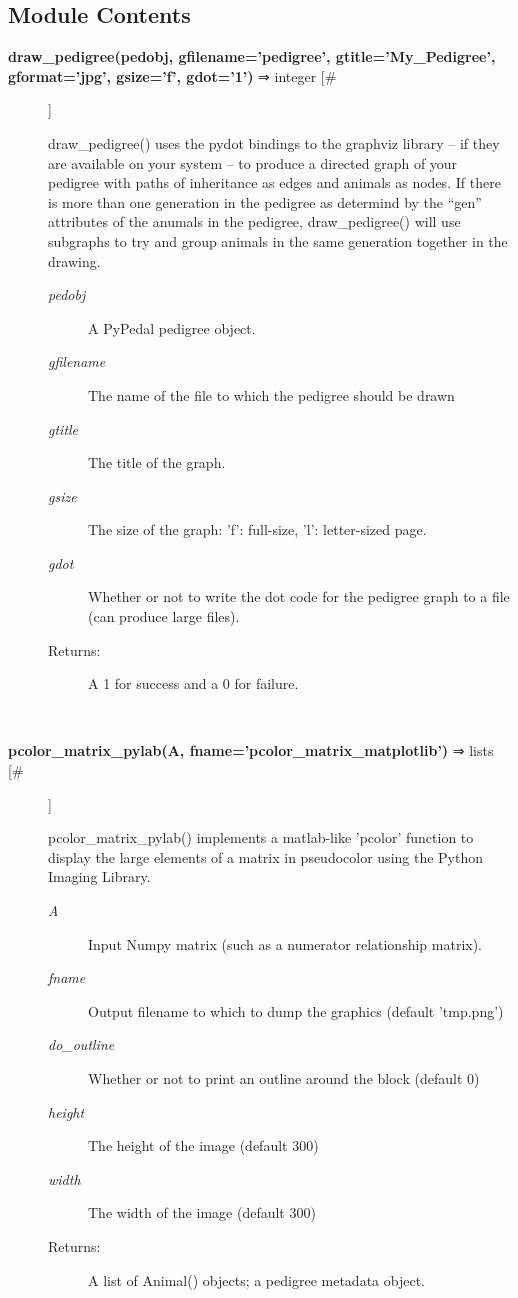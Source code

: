 \subsection*{Module Contents}
\begin{description}
\item[\textbf{draw\_pedigree(pedobj, gfilename='pedigree', gtitle='My\_Pedigree', gformat='jpg', gsize='f', gdot='1')}
 ⇒ integer [\#]]

 draw\_pedigree() uses the pydot bindings to the graphviz library -- if they are available on your system -- to produce a directed graph of your pedigree with paths of inheritance as edges and animals as nodes. If there is more than one generation in the pedigree as determind by the ``gen'' attributes of the anumals in the pedigree, draw\_pedigree() will use subgraphs to try and group animals in the same generation together in the drawing.
\begin{description}
\item[\emph{pedobj}
] A PyPedal pedigree object.
\item[\emph{gfilename}
] The name of the file to which the pedigree should be drawn
\item[\emph{gtitle}
] The title of the graph.
\item[\emph{gsize}
] The size of the graph: 'f': full-size, 'l': letter-sized page.
\item[\emph{gdot}
] Whether or not to write the dot code for the pedigree graph to a file (can produce large files).
\item[Returns:] A 1 for success and a 0 for failure.

\end{description}
\\ 

\item[\textbf{pcolor\_matrix\_pylab(A, fname='pcolor\_matrix\_matplotlib')}
 ⇒ lists [\#]]

 pcolor\_matrix\_pylab() implements a matlab-like 'pcolor' function to display the large elements of a matrix in pseudocolor using the Python Imaging Library.
\begin{description}
\item[\emph{A}
] Input Numpy matrix (such as a numerator relationship matrix).
\item[\emph{fname}
] Output filename to which to dump the graphics (default 'tmp.png')
\item[\emph{do\_outline}
] Whether or not to print an outline around the block (default 0)
\item[\emph{height}
] The height of the image (default 300)
\item[\emph{width}
] The width of the image (default 300)
\item[Returns:] A list of Animal() objects; a pedigree metadata object.


\end{description}
\end{description}
